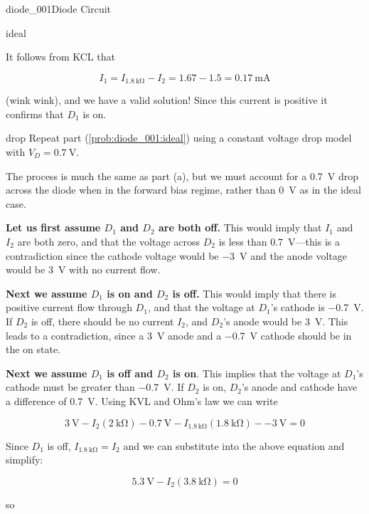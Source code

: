 \begin{mainquestion}{diode_001}{Diode Circuit}
\begin{partquestion}{ideal}
\begin{answer}
It follows from KCL that

\[
I_1
=
I_{\qty{1.8}{\kilo\ohm}}-I_2
=
1.67-1.5
=
\qty{0.17}{\milli\ampere}
\]

(wink wink), and we have a valid solution! Since this current is positive it confirms that $D_1$ is on.
\end{answer}
\end{partquestion}

\begin{partquestion}{drop}
{Repeat part (\cref{prob:diode_001:ideal}) using a constant voltage drop model with $V_D = \qty{0.7}{\volt}$.}

\begin{answer}
The process is much the same as part (a), but we must account for a \qty{0.7}{\volt} drop across the diode when in the forward bias regime, rather than \qty{0}{\volt} as in the ideal case.

\textbf{Let us first assume $D_1$ and $D_2$ are both off.} This would imply that $I_1$ and $I_2$ are both zero, and that the voltage across $D_2$ is less than \qty{0.7}{\volt}—this is a contradiction since the cathode voltage would be \qty{-3}{\volt} and the anode voltage would be \qty{3}{\volt} with no current flow.

\textbf{Next we assume $D_1$ is on and $D_2$ is off.} This would imply that there is positive current flow through $D_1$, and that the voltage at $D_1$'s cathode is \qty{-0.7}{\volt}. If $D_2$ is off, there should be no current $I_2$, and $D_2$'s anode would be \qty{3}{\volt}. This leads to a contradiction, since a \qty{3}{\volt} anode and a \qty{-0.7}{\volt} cathode should be in the on state.

\textbf{Next we assume $D_1$ is off and $D_2$ is on}. This implies that the voltage at $D_1$'s cathode must be greater than \qty{-0.7}{\volt}. If $D_2$ is on, $D_2$'s anode and cathode have a difference of \qty{0.7}{\volt}. Using KVL and Ohm's law we can write

\[
\qty{3}{\volt}
-
I_2\left(\qty{2}{\kilo\ohm}\right)
-
\qty{0.7}{\volt}
-
I_{1.8\,\mathrm{k\Omega}}\left(\qty{1.8}{\kilo\ohm}\right)
-
\qty{-3}{\volt}
=
0
\]

Since $D_1$ is off, $I_{\qty{1.8}{\kilo\ohm}} = I_2$ and we can substitute into the above equation and simplify:

\[
\qty{5.3}{\volt}
-
I_2\left(\qty{3.8}{\kilo\ohm}\right)
=
0
\]

so


\end{answer}
\end{partquestion}
\end{mainquestion}

